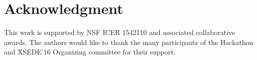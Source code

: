 \documentclass[conference]{IEEEtran}
\begin{document}


\section*{Acknowledgment}
This work is supported by NSF ICER 1542110 and associated collaborative
awards. The authors would like to thank the many participants of the Hackathon
and XSEDE'16 Organizing committee for their support.






%
%
%
%



\end{document}
